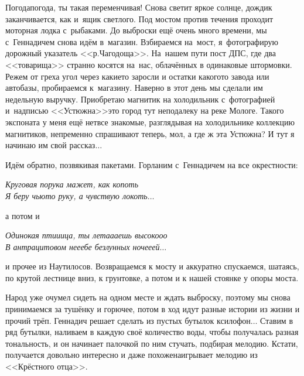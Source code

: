 Погода\sdash погода, ты такая переменчивая! Снова светит яркое солнце, дождик заканчивается, как и~ящик светлого. Под мостом против течения проходит моторная лодка с~рыбаками. До выброски ещё очень много времени, мы с~Геннадичем снова идём в~магазин.  Взбираемся на~мост, я~фотографирую дорожный указатель <<р.\thinspace Чагодоща>>. На~нашем пути пост ДПС, где два <<товарища>> странно косятся на~нас, облачённых в одинаковые штормовки. Режем от греха угол через какие\sdash то заросли и остатки какого\sdash то завода или автобазы, пробираемся к~магазину. Наверно в этот день мы сделали им недельную выручку. Приобретаю магнитик на холодильник с~фотографией и~надписью <<Устюжна>>\mdash это город тут неподалеку на реке Мологе. Такого экспоната у меня ещё нет\mdash все знакомые, разглядывая на холодильнике коллекцию магнитиков, непременно спрашивают теперь, мол, а где ж эта Устюжна? И тут я начинаю им свой рассказ$\ldots$

Идём обратно, позвякивая пакетами. Горланим с~Геннадичем на все окрестности: 

\noindent\textit{%
	\hspace*{1.2cm}Круговая порука мажет, как копоть\mdash \\
	\hspace*{1.2cm}Я беру чью\sdash то руку, а чувствую локоть$\ldots$
}

\noindent а потом и 

\noindent\textit{%
	\hspace*{1.2cm}Одинокая пти\sdash и\sdash ица, ты лета\sdash а\sdash аешь высоко\sdash о\sdash о\\
	\hspace*{1.2cm}В антрацитовом не\sdash е\sdash ебе безлунных ноче\sdash е\sdash ей$\ldots$
}

\noindent и прочее из Наутилосов.
Возвращаемся к мосту и аккуратно спускаемся, шатаясь, по крутой лестнице вниз, к грунтовке, а потом и к нашей стоянке у опоры моста. 

Народ уже очумел сидеть на одном месте и ждать выброску, поэтому мы снова принимаемся за тушёнку и горючее, потом в ход идут разные истории из жизни и прочий трёп. Геннадич решает сделать из пустых бутылок ксилофон$\ldots$ Ставим в ряд бутылки, наливаем в каждую своё количество воды, чтобы получалась разная тональность, и он начинает палочкой по ним стучать, подбирая мелодию. Кстати, получается довольно интересно и даже похоже\mdash наигрывает мелодию из <<Крёстного отца>>. 

